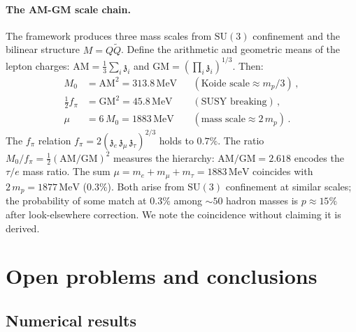 \documentclass[aps,prd,twocolumn,showpacs,preprintnumbers,superscriptaddress,floatfix]{revtex4-2}
\newcommand{\SU}{\mathrm{SU}}
\newcommand{\MeV}{\,\mathrm{MeV}}
\newcommand{\zch}{\mathfrak{z}}
\begin{document}
\paragraph{The AM-GM scale chain.}
The framework produces three mass scales from $\SU(3)$
confinement and the bilinear structure $M = Q\tilde{Q}$.
Define the arithmetic and geometric means of the lepton charges:
$\mathrm{AM} = \frac{1}{3}\sum_i \zch_i$ and
$\mathrm{GM} = (\prod_i \zch_i)^{1/3}$.
Then:
\begin{align}
  M_0 &= \mathrm{AM}^2 = 313.8\MeV
    && (\text{Koide scale} \approx m_p/3)\,,\\
  \tfrac{1}{2}f_\pi &= \mathrm{GM}^2 = 45.8\MeV
    && (\text{SUSY breaking})\,,\\
  \mu &= 6\,M_0 = 1883\MeV
    && (\text{mass scale} \approx 2\,m_p)\,.
\end{align}
The $f_\pi$ relation $f_\pi = 2(\zch_e\,\zch_\mu\,\zch_\tau)^{2/3}$
holds to $0.7\%$.
The ratio $M_0/f_\pi = \frac{1}{2}(\mathrm{AM}/\mathrm{GM})^2$
measures the hierarchy: $\mathrm{AM}/\mathrm{GM} = 2.618$ encodes
the $\tau/e$ mass ratio.
The sum $\mu = m_e + m_\mu + m_\tau = 1883\MeV$ coincides with
$2\,m_p = 1877\MeV$ ($0.3\%$).
Both arise from $\SU(3)$ confinement at similar scales; the
probability of some match at $0.3\%$ among $\sim\!50$ hadron
masses is $p \approx 15\%$ after look-elsewhere correction.
We note the coincidence without claiming it is derived.


\section{Open problems and conclusions}
\label{sec:open}

\subsection{Numerical results}
\end{document}

